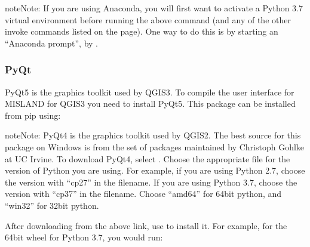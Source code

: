 \documentclass[letterpaper,10pt,english]{sphinxmanual}
\begin{document}
\begin{sphinxadmonition}{note}{Note:}
\sphinxAtStartPar
If you are using Anaconda, you will first want to activate a Python 3.7
virtual environment before running the above command (and any of the other
invoke commands listed on the page). One way to do this is by starting an
“Anaconda prompt”, by .
\end{sphinxadmonition}


\subsubsection{PyQt}
\label{\detokenize{Qgis_Plugin/plugin_development:pyqt}}
\sphinxAtStartPar
PyQt5 is the graphics toolkit used by QGIS3. To compile the user interface for
MISLAND for QGIS3 you need to install PyQt5. This package can be installed
from pip using:

\begin{sphinxVerbatim}[commandchars=\\\{\}]
  
\end{sphinxVerbatim}

\begin{sphinxadmonition}{note}{Note:}
\sphinxAtStartPar
PyQt4 is the graphics toolkit used by QGIS2. The best source for this
package on Windows is from the set of packages maintained by Christoph
Gohlke at UC Irvine. To download PyQt4, select .
Choose the appropriate file for the version of Python you are using. For
example, if you are using Python 2.7, choose the version with “cp27” in the
filename. If you are using Python 3.7, choose the version with “cp37” in
the filename. Choose “amd64” for 64\sphinxhyphen{}bit python, and “win32” for 32\sphinxhyphen{}bit
python.

\sphinxAtStartPar
After downloading from the above link, use  to install it. For example,
for the 64\sphinxhyphen{}bit wheel for Python 3.7, you would run:

\begin{sphinxVerbatim}[commandchars=\\\{\}]
  
\end{sphinxVerbatim}
\end{sphinxadmonition}
\end{document}
